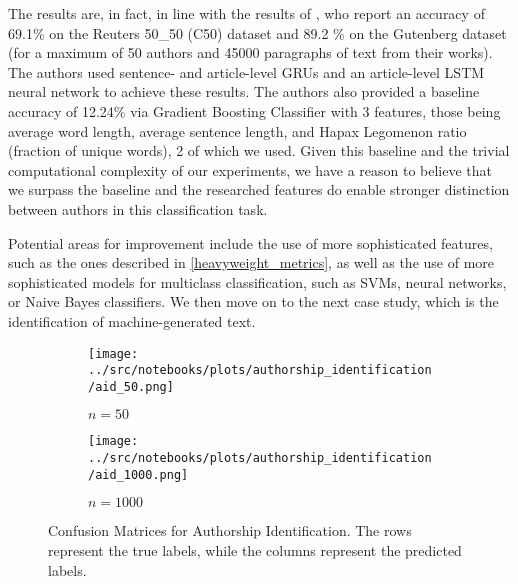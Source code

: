 The results are, in fact, in line with the results of \cite{qian_deep_nodate}, who report an accuracy of 69.1\% on the Reuters 50\_50 (C50) dataset and 89.2 \% on the Gutenberg dataset (for a maximum of 50 authors and 45000 paragraphs of text from their works). The authors used sentence- and article-level GRUs and an article-level LSTM neural network to achieve these results. The authors also provided a baseline accuracy of 12.24\% via Gradient Boosting Classifier with 3 features, those being average word length, average sentence length, and Hapax Legomenon ratio (fraction of unique words), 2 of which we used. Given this baseline and the trivial computational complexity of our experiments, we have a reason to believe that we surpass the baseline and the researched features do enable stronger distinction between authors in this classification task.

Potential areas for improvement include the use of more sophisticated features, such as the ones described in \ref{heavyweight_metrics}, as well as the use of more sophisticated models for multiclass classification, such as SVMs, neural networks, or Naive Bayes classifiers. We then move on to the next case study, which is the identification of machine-generated text.

\begin{figure}[htbp]
    \begin{subfigure}[t]{0.5\textwidth}
        \texttt{[image: ../src/notebooks/plots/authorship\_identification/aid\_50.png]}
        \caption{$n=50$}\label{cn_50}
    \end{subfigure}
    \begin{subfigure}[t]{0.5\textwidth}
        \texttt{[image: ../src/notebooks/plots/authorship\_identification/aid\_1000.png]}
        \caption{$n=1000$}\label{cn_1000}
    
    \end{subfigure}
    \caption{Confusion Matrices for Authorship Identification. The rows represent the true labels, while the columns represent the predicted labels.}
    \label{fig:cmatrix_authorship_identification}

\end{figure}


